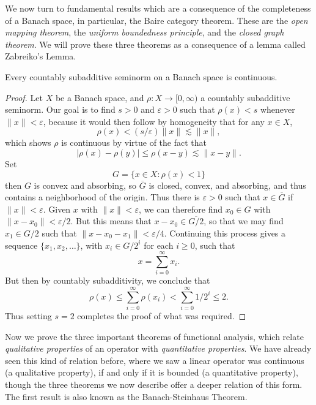 We now turn to fundamental results which are a consequence of the completeness of a Banach space, in particular, the Baire category theorem. These are the \emph{open mapping theorem}, the \emph{uniform boundedness principle}, and the \emph{closed graph theorem}. We will prove these three theorems as a consequence of a lemma called Zabreiko's Lemma.

\begin{lemma}
    Every countably subadditive seminorm on a Banach space is continuous.
\end{lemma}
\begin{proof}
    Let $X$ be a Banach space, and $\rho: X \to [0,\infty)$ a countably subadditive seminorm. Our goal is to find $s > 0$ and $\varepsilon > 0$ such that $\rho(x) < s$ whenever $\| x \| < \varepsilon$, because it would then follow by homogeneity that for any $x \in X$,
    \[ \rho(x) < (s/\varepsilon) \| x \| \lesssim \| x \|, \]
    which shows $\rho$ is continuous by virtue of the fact that
    \[ |\rho(x) - \rho(y)| \leq \rho(x - y) \lesssim \| x - y \|. \]
    Set
    \[ G = \{ x \in X: \rho(x) < 1 \} \]
    then $G$ is convex and absorbing, so $\overline{G}$ is closed, convex, and absorbing, and thus contains a neighborhood of the origin. Thus there is $\varepsilon > 0$ such that $x \in \overline{G}$ if $\| x \| < \varepsilon$. Given $x$ with $\| x \| < \varepsilon$, we can therefore find $x_0 \in G$ with $\| x - x_0 \| < \varepsilon / 2$. But this means that $x - x_0 \in \overline{G/2}$, so that we may find $x_1 \in G/2$ such that $\| x - x_0 - x_1 \| < \varepsilon / 4$. Continuing this process gives a sequence $\{ x_1, x_2, \dots \}$, with $x_i \in G/2^i$ for each $i \geq 0$, such that
    \[ x = \sum_{i = 0}^\infty x_i. \]
    But then by countably subadditivity, we conclude that
    \[ \rho(x) \leq \sum_{i = 0}^\infty \rho(x_i) < \sum_{i = 0}^\infty 1/2^i \leq 2. \]
    Thus setting $s = 2$ completes the proof of what was required.
\end{proof}

Now we prove the three important theorems of functional analysis, which relate \emph{qualitative properties} of an operator with \emph{quantitative properties}. We have already seen this kind of relation before, where we saw a linear operator was continuous (a qualitative property), if and only if it is bounded (a quantitative property), though the three theorems we now describe offer a deeper relation of this form. The first result is also known as the Banach-Steinhaus Theorem.

